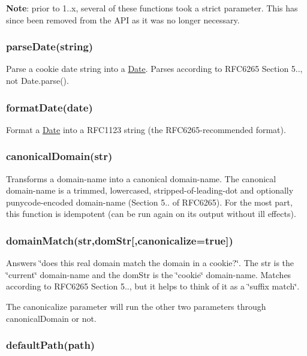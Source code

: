 {\bfseries Note}\+: prior to 1..\+x, several of these functions took a {\ttfamily strict} parameter. This has since been removed from the A\+PI as it was no longer necessary.

\subsubsection*{{\ttfamily parse\+Date(string)}}

Parse a cookie date string into a {\ttfamily \mbox{\hyperlink{classDate}{Date}}}. Parses according to R\+F\+C6265 Section 5.., not {\ttfamily Date.\+parse()}.

\subsubsection*{{\ttfamily format\+Date(date)}}

Format a \mbox{\hyperlink{classDate}{Date}} into a R\+F\+C1123 string (the R\+F\+C6265-\/recommended format).

\subsubsection*{{\ttfamily canonical\+Domain(str)}}

Transforms a domain-\/name into a canonical domain-\/name. The canonical domain-\/name is a trimmed, lowercased, stripped-\/of-\/leading-\/dot and optionally punycode-\/encoded domain-\/name (Section 5.. of R\+F\+C6265). For the most part, this function is idempotent (can be run again on its output without ill effects).

\subsubsection*{{\ttfamily domain\+Match(str,dom\+Str\mbox{[},canonicalize=true\mbox{]})}}

Answers \char`\"{}does this real domain match the domain in a cookie?\char`\"{}. The {\ttfamily str} is the \char`\"{}current\char`\"{} domain-\/name and the {\ttfamily dom\+Str} is the \char`\"{}cookie\char`\"{} domain-\/name. Matches according to R\+F\+C6265 Section 5.., but it helps to think of it as a \char`\"{}suffix match\char`\"{}.

The {\ttfamily canonicalize} parameter will run the other two parameters through {\ttfamily canonical\+Domain} or not.

\subsubsection*{{\ttfamily default\+Path(path)}}

